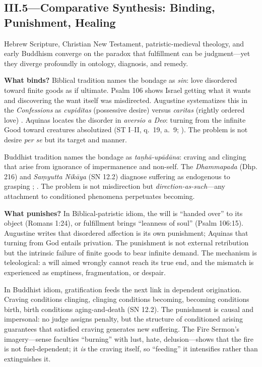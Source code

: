 \subsection*{III.5—Comparative Synthesis: Binding, Punishment, Healing}
\label{ssec:iii-synthesis}

Hebrew Scripture, Christian New Testament, patristic-medieval theology, and early Buddhism
converge on the paradox that fulfillment can be judgment---yet they diverge profoundly in
ontology, diagnosis, and remedy.

\textbf{What binds?} Biblical tradition names the bondage as \emph{sin}: love disordered
toward finite goods as if ultimate. Psalm 106 shows Israel getting what it wants and
discovering the want itself was misdirected. Augustine systematizes this in the
\emph{Confessions} as \emph{cupiditas} (possessive desire) versus \emph{caritas} (rightly
ordered love) \parencite[p.~47]{AugustineConfessions1998}. Aquinas locates the disorder in
\emph{aversio a Deo}: turning from the infinite Good toward creatures absolutized (ST I--II,
q.~19, a.~9; \parencite{AquinasST1947}). The problem is not desire \emph{per se} but its
target and manner.

Buddhist tradition names the bondage as \emph{taṇhā-upādāna}: craving and clinging that arise
from ignorance of impermanence and non-self. The \emph{Dhammapada} (Dhp. 216) and
\emph{Saṃyutta Nikāya} (SN 12.2) diagnose suffering as endogenous to grasping
\parencite{BuddharakkhitaDhp1993}; \parencite[p.~536]{BodhiSN2000}. The problem is not
misdirection but \emph{direction-as-such}---any attachment to conditioned phenomena
perpetuates becoming.

\textbf{What punishes?} In Biblical-patristic idiom, the will is ``handed over'' to its object
(Romans 1:24), or fulfillment brings ``leanness of soul'' (Psalm 106:15). Augustine writes
that disordered affection is its own punishment; Aquinas that turning from God entails
privation. The punishment is not external retribution but the intrinsic failure of finite goods
to bear infinite demand. The mechanism is teleological: a will aimed wrongly cannot reach its
true end, and the mismatch is experienced as emptiness, fragmentation, or despair.

In Buddhist idiom, gratification feeds the next link in dependent origination. Craving
conditions clinging, clinging conditions becoming, becoming conditions birth, birth conditions
aging-and-death (SN 12.2). The punishment is causal and impersonal: no judge assigns penalty,
but the structure of conditioned arising guarantees that satisfied craving generates new
suffering. The Fire Sermon's imagery---sense faculties ``burning'' with lust, hate,
delusion---shows that the fire is not fuel-dependent; it \emph{is} the craving itself, so
``feeding'' it intensifies rather than extinguishes it.

